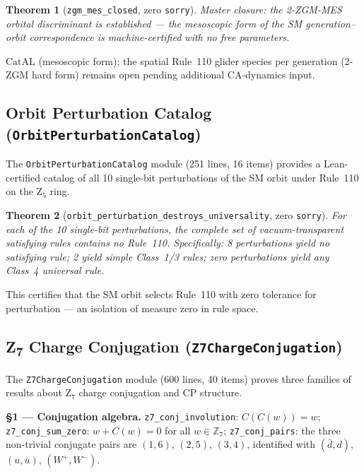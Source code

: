\documentclass[11pt,a4paper]{article}
\newtheorem{theorem}{Theorem}[section]
\theoremstyle{definition}
\newcommand{\CatAL}{\ensuremath{\mathrm{CatAL}}}
\begin{document}
\begin{theorem}[\lstinline|zgm_mes_closed|, zero \texttt{sorry}]
Master closure: the 2-ZGM-MES orbital discriminant is established — the
mesoscopic form of the SM generation--orbit correspondence is machine-certified
with no free parameters.
\end{theorem}

$\CatAL$ (mesoscopic form); the spatial Rule~110 glider
species per generation (2-ZGM hard form) remains open pending additional CA-dynamics
input.

\subsection{Orbit Perturbation Catalog (\texttt{OrbitPerturbationCatalog})}\label{subsec:orbit-perturbation}

The \texttt{OrbitPerturbationCatalog} module (251 lines, 16 items) provides a
Lean-certified catalog of all 10 single-bit perturbations of the SM orbit under
Rule~110 on the Z$_5$ ring.

\begin{theorem}[\lstinline|orbit_perturbation_destroys_universality|, zero \texttt{sorry}]
For each of the 10 single-bit perturbations, the complete set of vacuum-transparent
satisfying rules contains no Rule~110.  Specifically: 8 perturbations yield no satisfying
rule; 2 yield simple Class~1/3 rules; zero perturbations yield any Class~4 universal rule.
\end{theorem}

This certifies that the SM orbit selects Rule~110 with zero tolerance for perturbation
— an isolation of measure zero in rule space.

\subsection{Z\textsubscript{7} Charge Conjugation (\texttt{Z7ChargeConjugation})}\label{subsec:z7-charge-conjugation}

The \texttt{Z7ChargeConjugation} module (600 lines, 40 items) proves three families
of results about Z$_7$ charge conjugation and CP structure.

\textbf{§1 — Conjugation algebra.}
\lstinline|z7_conj_involution|: $C(C(w)) = w$;
\lstinline|z7_conj_sum_zero|: $w + C(w) = 0$ for all $w\in\mathbb{Z}_7$;
\lstinline|z7_conj_pairs|: the three non-trivial conjugate pairs are
$(1,6)$, $(2,5)$, $(3,4)$, identified with $(\bar{d}, d)$, $(u, \bar{u})$, $(W^+, W^-)$.
\end{document}
